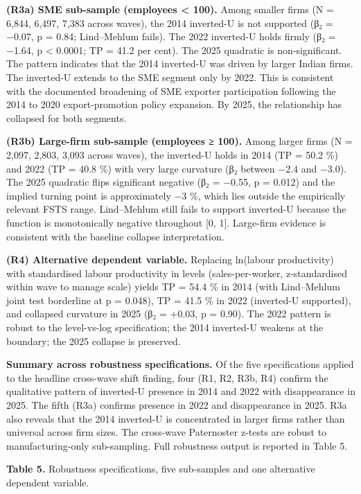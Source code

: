 \documentclass[
  12pt,a4paper]{article}
\begin{document}
\textbf{(R3a) SME sub-sample (employees \textless{} 100).} Among smaller
firms (N = 6,844, 6,497, 7,383 across waves), the 2014 inverted-U is not
supported (β₂ = −0.07, p = 0.84; Lind--Mehlum fails). The 2022
inverted-U holds firmly (β₂ = −1.64, p \textless{} 0.0001; TP = 41.2 per
cent). The 2025 quadratic is non-significant. The pattern indicates that
the 2014 inverted-U was driven by larger Indian firms. The inverted-U
extends to the SME segment only by 2022. This is consistent with the
documented broadening of SME exporter participation following the 2014
to 2020 export-promotion policy expansion. By 2025, the relationship has
collapsed for both segments.

\textbf{(R3b) Large-firm sub-sample (employees ≥ 100).} Among larger
firms (N = 2,097, 2,803, 3,093 across waves), the inverted-U holds in
2014 (TP = 50.2 \%) and 2022 (TP = 40.8 \%) with very large curvature
(β₂ between −2.4 and −3.0). The 2025 quadratic flips significant
negative (β₂ = −0.55, p = 0.012) and the implied turning point is
approximately −3 \%, which lies outside the empirically relevant FSTS
range. Lind--Mehlum still fails to support inverted-U because the
function is monotonically negative throughout {[}0, 1{]}. Large-firm
evidence is consistent with the baseline collapse interpretation.

\textbf{(R4) Alternative dependent variable.} Replacing ln(labour
productivity) with standardised labour productivity in levels
(sales-per-worker, z-standardised within wave to manage scale) yields TP
= 54.4 \% in 2014 (with Lind--Mehlum joint test borderline at p =
0.048), TP = 41.5 \% in 2022 (inverted-U supported), and collapsed
curvature in 2025 (β₂ = +0.03, p = 0.90). The 2022 pattern is robust to
the level-vs-log specification; the 2014 inverted-U weakens at the
boundary; the 2025 collapse is preserved.

\textbf{Summary across robustness specifications.} Of the five
specifications applied to the headline cross-wave shift finding, four
(R1, R2, R3b, R4) confirm the qualitative pattern of inverted-U presence
in 2014 and 2022 with disappearance in 2025. The fifth (R3a) confirms
presence in 2022 and disappearance in 2025. R3a also reveals that the
2014 inverted-U is concentrated in larger firms rather than universal
across firm sizes. The cross-wave Paternoster z-tests are robust to
manufacturing-only sub-sampling. Full robustness output is reported in
Table 5.

\textbf{Table 5.} Robustness specifications, five sub-samples and one
alternative dependent variable.
\end{document}
